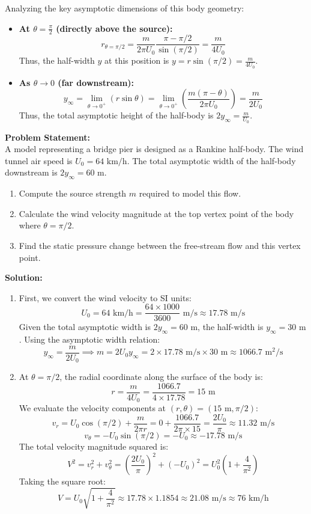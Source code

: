 Analyzing the key asymptotic dimensions of this body geometry:
\begin{itemize}
    \item \textbf{At $\theta = \frac{\pi}{2}$ (directly above the source):}
    $$r_{\theta=\pi/2} = \frac{m}{2\pi U_0} \frac{\pi - \pi/2}{\sin(\pi/2)} = \frac{m}{4 U_0}$$
    Thus, the half-width $y$ at this position is $y = r \sin(\pi/2) = \frac{m}{4 U_0}$.
    \item \textbf{As $\theta \to 0$ (far downstream):}
    $$y_\infty = \lim_{\theta \to 0^+} (r \sin\theta) = \lim_{\theta \to 0^+} \left( \frac{m(\pi - \theta)}{2\pi U_0} \right) = \frac{m}{2 U_0}$$
    Thus, the total asymptotic height of the half-body is $2 y_\infty = \frac{m}{U_0}$.
\end{itemize}

\newpage
\begin{exbox}
\textbf{Problem Statement:} \\
A model representing a bridge pier is designed as a Rankine half-body. The wind tunnel air speed is $U_0 = 64 \text{ km/h}$. The total asymptotic width of the half-body downstream is $2 y_\infty = 60 \text{ m}$.
\begin{enumerate}
    \item Compute the source strength $m$ required to model this flow.
    \item Calculate the wind velocity magnitude at the top vertex point of the body where $\theta = \pi/2$.
    \item Find the static pressure change between the free-stream flow and this vertex point.
\end{enumerate}

\textbf{Solution:}
\begin{enumerate}
    \item First, we convert the wind velocity to SI units:
    $$U_0 = 64 \text{ km/h} = \frac{64 \times 1000}{3600} \text{ m/s} \approx 17.78 \text{ m/s}$$
    Given the total asymptotic width is $2y_\infty = 60 \text{ m}$, the half-width is $y_\infty = 30 \text{ m}$. Using the asymptotic width relation:
    $$y_\infty = \frac{m}{2 U_0} \implies m = 2 U_0 y_\infty = 2 \times 17.78 \text{ m/s} \times 30 \text{ m} \approx 1066.7 \text{ m}^2/\text{s}$$

    \item At $\theta = \pi/2$, the radial coordinate along the surface of the body is:
    $$r = \frac{m}{4 U_0} = \frac{1066.7}{4 \times 17.78} = 15 \text{ m}$$
    We evaluate the velocity components at $(r, \theta) = \left( 15 \text{ m}, \pi/2 \right)$:
    $$v_r = U_0 \cos(\pi/2) + \frac{m}{2\pi r} = 0 + \frac{1066.7}{2 \pi \times 15} = \frac{2 U_0}{\pi} \approx 11.32 \text{ m/s}$$
    $$v_\theta = -U_0 \sin(\pi/2) = -U_0 \approx -17.78 \text{ m/s}$$
    The total velocity magnitude squared is:
    $$V^2 = v_r^2 + v_\theta^2 = \left( \frac{2 U_0}{\pi} \right)^2 + (-U_0)^2 = U_0^2 \left( 1 + \frac{4}{\pi^2} \right)$$
    Taking the square root:
    $$V = U_0 \sqrt{1 + \frac{4}{\pi^2}} \approx 17.78 \times 1.1854 \approx 21.08 \text{ m/s} \approx 76 \text{ km/h}$$


\end{enumerate}
\end{exbox}

